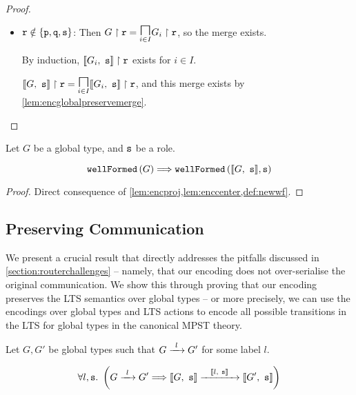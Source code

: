 \begin{proof}
\begin{enumerate}
\begin{itemize}
\begin{itemize}
\item ${\mathtt{r}} \notin \{{\mathtt{p}},{\mathtt{q}},{\mathtt{s}}\}$:
Then $\proj{G}{r} = \underset{i \in I}{\MERGEOP}\proj{G_i}{r}$,
so the merge exists.

By induction, ${\llbracket {G_i},~{\mathtt{s}} \rrbracket} \upharpoonright {\mathtt{r}}$ exists for $i \in I$.

$\proj{\enc{G}{s}}{r} = 
	\underset{i \in I}{\MERGEOP}\proj{\enc{G_i}{s}}{r}$,
and this merge exists by \cref{lem:encglobalpreservemerge}.

\end{itemize} %

\end{itemize} %

\end{enumerate} %

\end{proof}

\begin{theorem}
Let $G$ be a global type, and ${\mathtt{s}}$ be a role.

\[
\textnormal{\texttt{wellFormed}}\left(G\right) \Longrightarrow \textnormal{\texttt{wellFormed}}\left(\llbracket {G},~{\mathtt{s}} \rrbracket, {\mathtt{s}}\right)
\]

\label{th:encwf}
\end{theorem}

\begin{proof}
Direct consequence of \cref{lem:encproj,lem:enccenter,def:newwf}.
\end{proof}

\subsection{Preserving Communication}
\label{subsection:encodepreservecomm}

We present a crucial result that directly addresses 
the pitfalls discussed in \cref{section:routerchallenges} --
namely, that our encoding does not over-serialise the
original communication.
We show this through proving that our encoding preserves
the LTS semantics over global types -- or more precisely,
we can use the encodings over global types and LTS actions
to encode all possible transitions in the LTS for
global types in the canonical MPST theory.

\begin{theorem}
Let $G, G'$ be global types
such that $\treduce{G}{G'}{l}$ for some label $l$.

\[
\forall l, \mrole{s}. ~ \left(
\treduce{G}{G'}{l}
	\Longrightarrow
\treducelong{\enc{G}{s}}{\enc{G'}{s}}{\enc{l}{s}} \right)
\]

\end{theorem}

